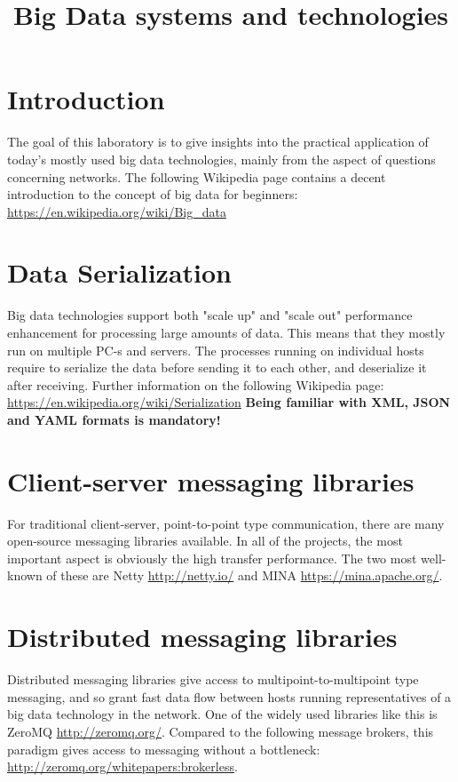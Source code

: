 \documentclass[a4paper]{article}
\title{Big Data systems and technologies}
\author{}
\date{}
\begin{document}
\maketitle

\tableofcontents

\section{Introduction}

The goal of this laboratory is to give insights into the practical application 
of today's mostly used big data technologies, mainly from the aspect of 
questions concerning networks. The following Wikipedia page contains a 
decent introduction to the concept of big data for beginners: \url{https://en.wikipedia.org/wiki/Big_data}

\section{Data Serialization}

Big data technologies support both "scale up" and "scale out" performance
enhancement for processing large amounts of data. This means that they mostly 
run on multiple PC-s and servers. The processes running on individual 
hosts require to serialize the data before sending it to each other, and
deserialize it after receiving. Further information on the following Wikipedia page:
\url{https://en.wikipedia.org/wiki/Serialization}
\textbf{Being familiar with XML, JSON and YAML formats is mandatory!}


\section{Client-server messaging libraries}

For traditional client-server, point-to-point type communication, there are many
open-source messaging libraries available. In all of the projects, the most 
important aspect is obviously the high transfer performance. The two most
well-known of these are Netty
\url{http://netty.io/} 
and MINA
\url{https://mina.apache.org/}.

\section{Distributed messaging libraries}

Distributed messaging libraries give access to multipoint-to-multipoint type messaging,
and so grant fast data flow between hosts running representatives of a big data technology
in the network. One of the widely used libraries like this is ZeroMQ
\url{http://zeromq.org/}.
Compared to the following message brokers, this paradigm gives access to messaging
without a bottleneck:
\url{http://zeromq.org/whitepapers:brokerless}.
\end{document}
